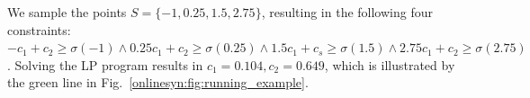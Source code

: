 We
sample the points  $ S = \{-1, 0.25, 1.5, 2.75\} $, resulting in the following
four constraints:
$ -c_1 + c_2 \geq \sigma(-1) \wedge 0.25c_1 + c_2 \geq \sigma(0.25) \wedge
1.5c_1 + c_s \geq \sigma(1.5) \wedge 2.75c_1 + c_2 \geq \sigma(2.75) $.	Solving
the LP program results in $ c_1 = 0.104, c_2 = 0.649 $, which is illustrated by the
green line in Fig.~\ref{onlinesyn:fig:running_example}.















